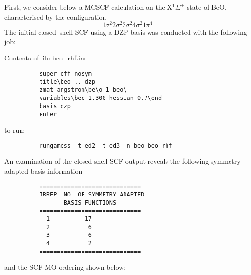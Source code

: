 \documentclass[11pt,fleqn]{article}
\begin{document}
First, we consider below a MCSCF calculation 
on the X$^{1}\Sigma^{+}$ state
of BeO, characterised by the configuration
\begin{equation}
  1\sigma^2 2\sigma^2 3\sigma^2 4\sigma^2 1\pi^4 
\end{equation}
The initial closed--shell SCF using a DZP basis was conducted with the
following job:

Contents of file beo\_rhf.in:
{
\footnotesize
\begin{verbatim}
          super off nosym
          title\beo .. dzp
          zmat angstrom\be\o 1 beo\
          variables\beo 1.300 hessian 0.7\end
          basis dzp
          enter
\end{verbatim}
}
to run:
{
\footnotesize
\begin{verbatim}
          rungamess -t ed2 -t ed3 -n beo beo_rhf
\end{verbatim}
}
An examination of the closed-shell SCF output reveals the
following symmetry adapted basis information
{
\footnotesize
\begin{verbatim}
          =============================
          IRREP  NO. OF SYMMETRY ADAPTED
                 BASIS FUNCTIONS
          =============================
            1          17
            2           6
            3           6
            4           2
          =============================
\end{verbatim}
}
and the SCF MO ordering shown below:
\end{document}
